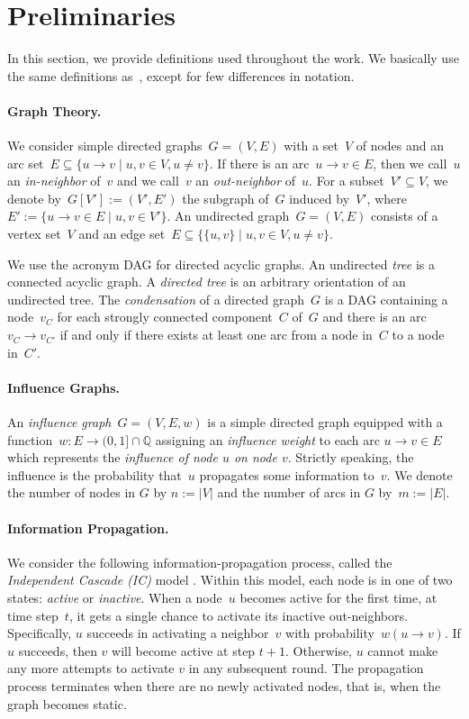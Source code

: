 \documentclass{article}
\newcommand{\Q}{{\mathbb{Q}}}
\begin{document}
\section{Preliminaries}\label{sect:prelim}
In this section, we provide definitions used throughout the work.
We basically use the same definitions as~\citet{LTGMH10},
except for few differences in notation.

\paragraph{Graph Theory.}
We consider simple directed graphs~$G=(V,E)$ with a set~$V$ of nodes
and an arc set~$E\subseteq \{u\to v \mid u,v\in V, u\neq v\}$.
If there is an arc~$u\to v\in E$, then we call~$u$ an \emph{in-neighbor} of~$v$ and we call~$v$ an \emph{out-neighbor} of~$u$. For a subset~$V'\subseteq V$, we denote by~$G[V']:=(V', E')$ the subgraph of~$G$ induced by~$V'$, where $E':=\{u\to v\in E\mid u,v\in V'\}$.
An undirected graph~$G=(V,E)$ consists of a vertex set~$V$ and an edge set~$E\subseteq\{\{u,v\}\mid u,v\in V, u\neq v\}$.

We use the acronym DAG for directed acyclic graphs.
An undirected \emph{tree} is a connected acyclic graph.
A \emph{directed tree} is an arbitrary orientation of an undirected tree.
The \emph{condensation} of a directed graph~$G$ is a DAG containing a node~$v_C$ for each
strongly connected component~$C$ of~$G$ and there is an arc~$v_C\to v_{C'}$
if and only if there exists at least one arc from a node in~$C$ to a node in~$C'$.


\paragraph{Influence Graphs.}
An \emph{influence graph}~$G=(V,E,w)$ is a simple directed
graph equipped with a function~$w:E\rightarrow (0,1]\cap\Q$
assigning an \emph{influence weight} to each arc $u\to v\in E$
which represents the \emph{influence of node $u$ on node $v$}. Strictly speaking,
the influence is the probability that~$u$ propagates some information to~$v$.
We denote the number of nodes in $G$ by $n := |V|$ and the
number of arcs in $G$ by~$m := |E|$.


\paragraph{Information Propagation.}
We consider the following information-propaga\-tion process,
called the \emph{Independent Cascade (IC)} model \cite{KKT15}.
Within this model, each node is in one of two states: \emph{active} or \emph{inactive}.
When a node~$u$ becomes active for the first time, at time step~$t$,
it gets a single chance to activate its inactive out-neighbors.
Specifically, $u$ succeeds in activating a neighbor~$v$ with probability~$w(u \to v)$.
If $u$ succeeds, then $v$ will become active at step $t + 1$.
Otherwise, $u$ cannot make any more attempts to activate $v$ in any subsequent round.
The propagation process terminates when there are no newly activated nodes,
that is,
when the graph becomes static.
\end{document}
